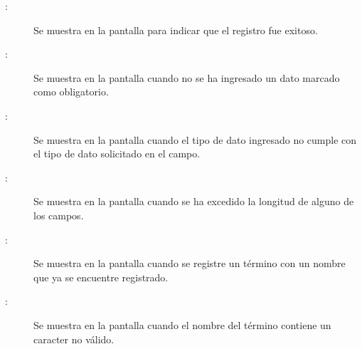	
\begin{description}
	\item[:] Se muestra en la pantalla  para indicar que el registro fue exitoso.
	\item[:] Se muestra en la pantalla  cuando no se ha ingresado un dato marcado como obligatorio.
	\item[:] Se muestra en la pantalla  cuando el tipo de dato ingresado no cumple con el tipo de dato solicitado en el campo.
	\item[:] Se muestra en la pantalla  cuando se ha excedido la longitud de alguno de los campos.
	\item[:] Se muestra en la pantalla  cuando se registre un término con un nombre que ya se encuentre registrado.
	\item[:] Se muestra en la pantalla  cuando el nombre del término contiene un caracter no válido.
\end{description}
